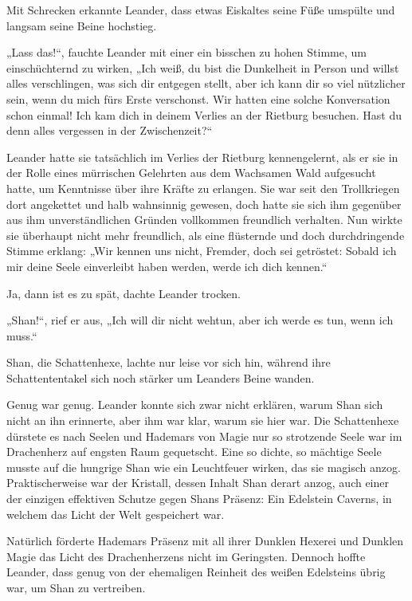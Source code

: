 Mit Schrecken erkannte Leander, dass etwas Eiskaltes seine Füße umspülte und langsam seine Beine hochstieg.

„Lass das!“, fauchte Leander mit einer ein bisschen zu hohen Stimme, um einschüchternd zu wirken, „Ich weiß, du bist die Dunkelheit in Person und willst alles verschlingen, was sich dir entgegen stellt, aber ich kann dir so viel nützlicher sein, wenn du mich fürs Erste verschonst. Wir hatten eine solche Konversation schon einmal! Ich kam dich in deinem Verlies an der Rietburg besuchen. Hast du denn alles vergessen in der Zwischenzeit?“

Leander hatte sie tatsächlich im Verlies der Rietburg kennengelernt, als er sie in der Rolle eines mürrischen Gelehrten aus dem Wachsamen Wald aufgesucht hatte, um Kenntnisse über ihre Kräfte zu erlangen. Sie war seit den Trollkriegen dort angekettet und halb wahnsinnig gewesen, doch hatte sie sich ihm gegenüber aus ihm unverständlichen Gründen vollkommen freundlich verhalten. Nun wirkte sie überhaupt nicht mehr freundlich, als eine flüsternde und doch durchdringende Stimme erklang: „Wir kennen uns nicht, Fremder, doch sei getröstet: Sobald ich mir deine Seele einverleibt haben werden, werde ich dich kennen.“

Ja, dann ist es zu spät, dachte Leander trocken.

„Shan!“, rief er aus, „Ich will dir nicht wehtun, aber ich werde es tun, wenn ich muss.“

Shan, die Schattenhexe, lachte nur leise vor sich hin, während ihre Schattententakel sich noch stärker um Leanders Beine wanden.

Genug war genug. Leander konnte sich zwar nicht erklären, warum Shan sich nicht an ihn erinnerte, aber ihm war klar, warum sie hier war. Die Schattenhexe dürstete es nach Seelen und Hademars von Magie nur so strotzende Seele war im Drachenherz auf engsten Raum gequetscht. Eine so dichte, so mächtige Seele musste auf die hungrige Shan wie ein Leuchtfeuer wirken, das sie magisch anzog. Praktischerweise war der Kristall, dessen Inhalt Shan derart anzog, auch einer der einzigen effektiven Schutze gegen Shans Präsenz: Ein Edelstein Caverns, in welchem das Licht der Welt gespeichert war.

Natürlich förderte Hademars Präsenz mit all ihrer Dunklen Hexerei und Dunklen Magie das Licht des Drachenherzens nicht im Geringsten. Dennoch hoffte Leander, dass genug von der ehemaligen Reinheit des weißen Edelsteins übrig war, um Shan zu vertreiben.

